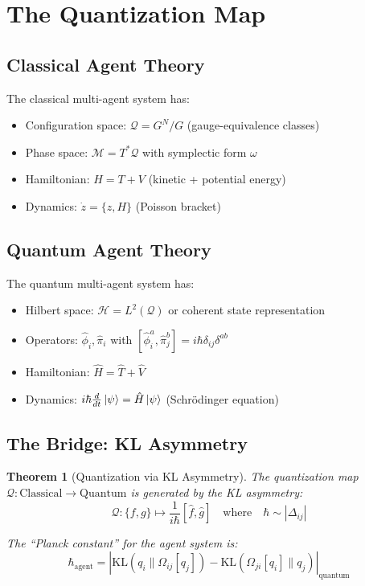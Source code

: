 \documentclass[11pt,a4paper]{article}
\newtheorem{theorem}{Theorem}[section]
\newcommand{\KL}{\mathrm{KL}}
\begin{document}
\section{The Quantization Map}

\subsection{Classical Agent Theory}

The classical multi-agent system has:
\begin{itemize}
    \item Configuration space: $\mathcal{Q} = G^N / G$ (gauge-equivalence classes)
    \item Phase space: $\mathcal{M} = T^*\mathcal{Q}$ with symplectic form $\omega$
    \item Hamiltonian: $H = T + V$ (kinetic + potential energy)
    \item Dynamics: $\dot{z} = \{z, H\}$ (Poisson bracket)
\end{itemize}

\subsection{Quantum Agent Theory}

The quantum multi-agent system has:
\begin{itemize}
    \item Hilbert space: $\mathcal{H} = L^2(\mathcal{Q})$ or coherent state representation
    \item Operators: $\hat{\phi}_i, \hat{\pi}_i$ with $[\hat{\phi}_i^a, \hat{\pi}_j^b] = i\hbar \delta_{ij} \delta^{ab}$
    \item Hamiltonian: $\hat{H} = \hat{T} + \hat{V}$
    \item Dynamics: $i\hbar \frac{d}{dt}\ket{\psi} = \hat{H}\ket{\psi}$ (Schrödinger equation)
\end{itemize}

\subsection{The Bridge: KL Asymmetry}

\begin{theorem}[Quantization via KL Asymmetry]
The quantization map $\mathcal{Q}: \text{Classical} \to \text{Quantum}$ is generated by the KL asymmetry:
\begin{equation}
    \boxed{\mathcal{Q}: \{f, g\} \mapsto \frac{1}{i\hbar}[\hat{f}, \hat{g}] \quad \text{where} \quad \hbar \sim |\Delta_{ij}|}
\end{equation}

The ``Planck constant'' for the agent system is:
\begin{equation}
    \hbar_{\text{agent}} = \left|\KL(q_i \| \Omega_{ij}[q_j]) - \KL(\Omega_{ji}[q_i] \| q_j)\right|_{\text{quantum}}
\end{equation}
\end{theorem}
\end{document}
